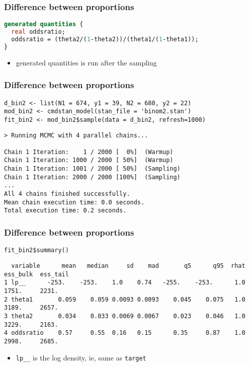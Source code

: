 \documentclass[finnish,english,t]{beamer}
\begin{document}
\begin{frame}[fragile]
  \frametitle{Difference between proportions}

  
  {\small
\begin{lstlisting}[language=Stan]
generated quantities {
  real oddsratio;
  oddsratio = (theta2/(1-theta2))/(theta1/(1-theta1));
}
\end{lstlisting}
    }

    \begin{itemize}
    \item generated quantities is run after the sampling
    \end{itemize}
    
\end{frame}

\begin{frame}[fragile]
  \frametitle{Difference between proportions}
  
  {\small
\begin{lstlisting}[]
d_bin2 <- list(N1 = 674, y1 = 39, N2 = 680, y2 = 22)
mod_bin2 <- cmdstan_model(stan_file = 'binom2.stan')
fit_bin2 <- mod_bin2$sample(data = d_bin2, refresh=1000)
\end{lstlisting}
  }

  {\tiny
\begin{lstlisting}
> Running MCMC with 4 parallel chains...

Chain 1 Iteration:    1 / 2000 [  0%]  (Warmup) 
Chain 1 Iteration: 1000 / 2000 [ 50%]  (Warmup) 
Chain 1 Iteration: 1001 / 2000 [ 50%]  (Sampling) 
Chain 1 Iteration: 2000 / 2000 [100%]  (Sampling) 
...
All 4 chains finished successfully.
Mean chain execution time: 0.0 seconds.
Total execution time: 0.2 seconds.
\end{lstlisting}
  }

\end{frame}

\begin{frame}[fragile]
  \frametitle{Difference between proportions}
  
  {\small
\begin{lstlisting}[]
fit_bin2$summary()
\end{lstlisting}
  }

  {\tiny
\begin{lstlisting}
  variable      mean   median     sd    mad       q5      q95  rhat ess_bulk  ess_tail
1 lp__      -253.    -253.    1.0    0.74   -255.    -253.      1.0    1751.     2231.
2 theta1       0.059    0.059 0.0093 0.0093    0.045    0.075   1.0    3189.     2657.
3 theta2       0.034    0.033 0.0069 0.0067    0.023    0.046   1.0    3229.     2163.
4 oddsratio    0.57     0.55  0.16   0.15      0.35     0.87    1.0    2998.     2685.
\end{lstlisting}
  }

  \begin{itemize}
  \item<2-> {\tt lp\_\_} is the log density, ie, same as {\tt target}
  \end{itemize}
  
\end{frame}
\end{document}
